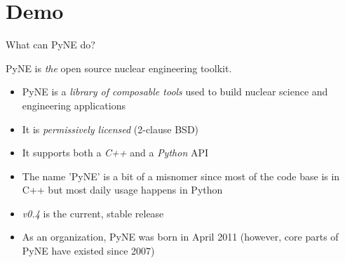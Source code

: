 \documentclass[xcolor=x11names,compress]{beamer}
\renewcommand{\(}{\begin{columns}}
\renewcommand{\)}{\end{columns}}
\newcommand{\<}[1]{\begin{column}{#1}}
\renewcommand{\>}{\end{column}}
\begin{document}
%
\section{Demo}
\begin{frame}{What can PyNE do?}

    PyNE is \textit{the} open source nuclear engineering toolkit.
    \vspace*{1em}
    \begin{itemize}
    \item PyNE is a \textit{library of composable tools} used to build 
    nuclear science and engineering applications
    \item It is \textit{permissively licensed} (2-clause BSD)
    \item It supports both a \textit{C++} and a \textit{Python} API
    \item The name 'PyNE' is a bit of a misnomer since most of the code 
    base is in C++ but most daily usage happens in Python
    \item \textit{v0.4} is the current, stable release
    \item As an organization, PyNE was born in April 2011 
    (however, core parts of PyNE have existed since 2007)
    \end{itemize}

\end{frame}

\end{document}
